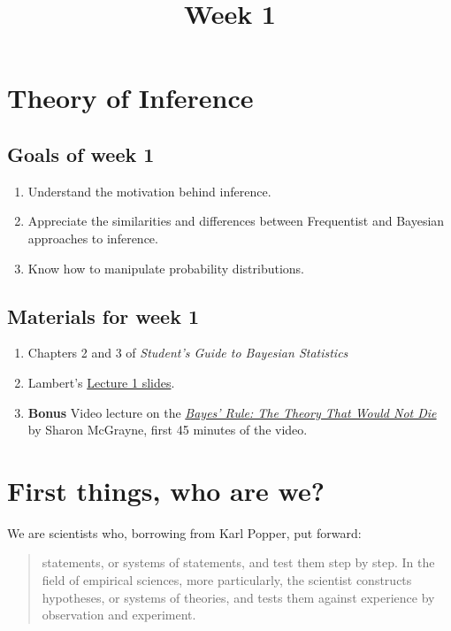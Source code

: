 \documentclass[]{article}
\date{}
\begin{document}
\title{Week 1}

\section{Theory of Inference}

\subsection{Goals of week 1}

\begin{enumerate}
\item
  Understand the motivation behind inference.
\item
  Appreciate the similarities and differences between Frequentist and
  Bayesian approaches to inference.
\item
  Know how to manipulate probability distributions.
\end{enumerate}

\subsection{Materials for week 1}

\begin{enumerate}
\item
  Chapters 2 and 3 of \emph{Student's Guide to Bayesian Statistics}
\item
  Lambert's
  \href{https://benlambertdotcom.files.wordpress.com/2016/05/bayesian-course-1-vfinal-vfinal.pdf}{Lecture
  1 slides}.
\item
  \textbf{Bonus} Video lecture on the
  \href{https://youtu.be/2o-_BGqYM5U}{\emph{Bayes' Rule: The Theory That
  Would Not Die}} by Sharon McGrayne, first 45 minutes of the video.
\end{enumerate}

\section{First things, who are we?}

We are scientists who, borrowing from Karl Popper, put forward:
\begin{quote} 
statements, or systems of statements, and test them step by step. In the field of empirical sciences, more particularly, the scientist constructs hypotheses, or systems of theories, and tests them against experience by observation and experiment.
\end{quote}
\end{document}
